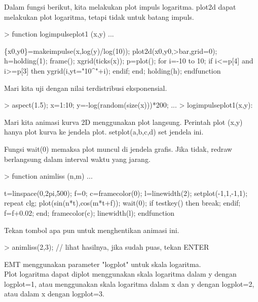 \documentclass{report}
\begin{document}
\begin{eulernotebook}
\begin{eulercomment}
\begin{eulercomment}
\begin{eulercomment}
\begin{eulercomment}
\begin{eulercomment}
Dalam fungsi berikut, kita melakukan plot impuls logaritma. plot2d
dapat melakukan plot logaritma, tetapi tidak untuk batang impuls.
\end{eulercomment}
\begin{eulerprompt}
> function logimpulseplot1 (x,y) ...
\end{eulerprompt}
\begin{eulerudf}
    \{x0,y0\}=makeimpulse(x,log(y)/log(10));
    plot2d(x0,y0,>bar,grid=0);
    h=holding(1);
    frame();
    xgrid(ticks(x));
    p=plot();
    for i=-10 to 10;
      if i<=p[4] and i>=p[3] then
         ygrid(i,yt="10^"+i);
      endif;
    end;
    holding(h);
  endfunction
\end{eulerudf}
\begin{eulercomment}
Mari kita uji dengan nilai terdistribusi eksponensial.
\end{eulercomment}
\begin{eulerprompt}
> aspect(1.5); x=1:10; y=-log(random(size(x)))*200; ...
> logimpulseplot1(x,y):
\end{eulerprompt}
\begin{eulercomment}
Mari kita animasi kurva 2D menggunakan plot langsung. Perintah plot
(x,y) hanya plot kurva ke jendela plot. setplot(a,b,c,d) set jendela
ini.

Fungsi wait(0) memaksa plot muncul di jendela grafis. Jika tidak,
redraw berlangsung dalam interval waktu yang jarang.
\end{eulercomment}
\begin{eulerprompt}
> function animliss (n,m) ...
\end{eulerprompt}
\begin{eulerudf}
  t=linspace(0,2pi,500);
  f=0;
  c=framecolor(0);
  l=linewidth(2);
  setplot(-1,1,-1,1);
  repeat
    clg;
    plot(sin(n*t),cos(m*t+f));
    wait(0);
    if testkey() then break; endif;
    f=f+0.02;
  end;
  framecolor(c);
  linewidth(l);
  endfunction
\end{eulerudf}
\begin{eulercomment}
Tekan tombol apa pun untuk menghentikan animasi ini.
\end{eulercomment}
\begin{eulerprompt}
> animliss(2,3); // lihat hasilnya, jika sudah puas, tekan ENTER
\end{eulerprompt}
\begin{eulercomment}
EMT menggunakan parameter "logplot" untuk skala logaritma.\\
Plot logaritma dapat diplot menggunakan skala logaritma dalam y dengan
logplot=1, atau menggunakan skala logaritma dalam x dan y dengan
logplot=2, atau dalam x dengan logplot=3.


\end{eulercomment}
\end{eulercomment}
\end{eulercomment}
\end{eulercomment}
\end{eulercomment}
\end{eulernotebook}
\end{document}
